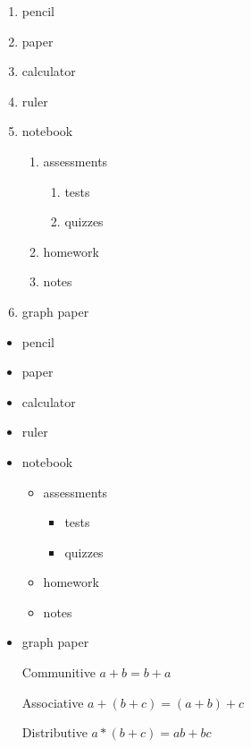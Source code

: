 \documentclass[11pt]{article}
\begin{document}
\begin{enumerate}
\item pencil
\item paper
\item calculator
\item ruler
\item notebook
	\begin{enumerate}
	\item assessments
		\begin{enumerate}
		\item tests
		\item quizzes
		\end{enumerate}
	\item homework
	\item notes
	\end{enumerate}
\item graph paper
\end{enumerate}

\begin{itemize}
\item pencil
\item paper
\item calculator
\item ruler
\item notebook
	\begin{itemize}
	\item assessments
		\begin{itemize}
		\item tests
		\item quizzes
		\end{itemize}
	\item homework
	\item notes
	\end{itemize}
\item graph paper
\end{itemize}

\begin{enumerate}
\item[Communitive] $a+b = b+a$
\item[Associative] $a+(b+c)=(a+b)+c$
\item[Distributive] $a*(b+c)=ab+bc$
\end{enumerate}
\end{document}
